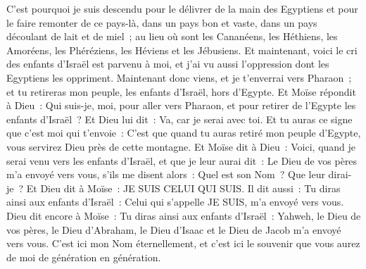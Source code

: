 \begin{multicols}{2}
C'est pourquoi je suis descendu pour le délivrer de la main des Egyptiens et pour le faire remonter de ce pays-là, dans un pays bon et vaste, dans un pays découlant de lait et de miel~; au lieu où sont les Cananéens, les Héthiens, les Amoréens, les Phéréziens, les Héviens et les Jébusiens.
Et maintenant, voici le cri des enfants d'Israël est parvenu à moi, et j'ai vu aussi l'oppression dont les Egyptiens les oppriment.
Maintenant donc viens, et je t'enverrai vers Pharaon~; et tu retireras mon peuple, les enfants d'Israël, hors d'Egypte.
Et Moïse répondit à Dieu~: Qui suis-je, moi, pour aller vers Pharaon, et pour retirer de l'Egypte les enfants d'Israël~?
Et Dieu lui dit~: Va, car je serai avec toi. Et tu auras ce signe que c'est moi qui t'envoie~: C'est que quand tu auras retiré mon peuple d'Egypte, vous servirez Dieu près de cette montagne.
Et Moïse dit à Dieu~: Voici, quand je serai venu vers les enfants d'Israël, et que je leur aurai dit~: Le Dieu de vos pères m'a envoyé vers vous, s'ils me disent alors~: Quel est son Nom~? Que leur dirai-je~?
 Et Dieu dit à Moïse~: JE SUIS CELUI QUI SUIS. Il dit aussi~: Tu diras ainsi aux enfants d'Israël~: Celui qui s'appelle JE SUIS, m'a envoyé vers vous.
Dieu dit encore à Moïse~: Tu diras ainsi aux enfants d'Israël~: Yahweh, le Dieu de vos pères, le Dieu d'Abraham, le Dieu d'Isaac et le Dieu de Jacob m'a envoyé vers vous. C'est ici mon Nom éternellement, et c'est ici le souvenir que vous aurez de moi de génération en génération.

\end{multicols}
